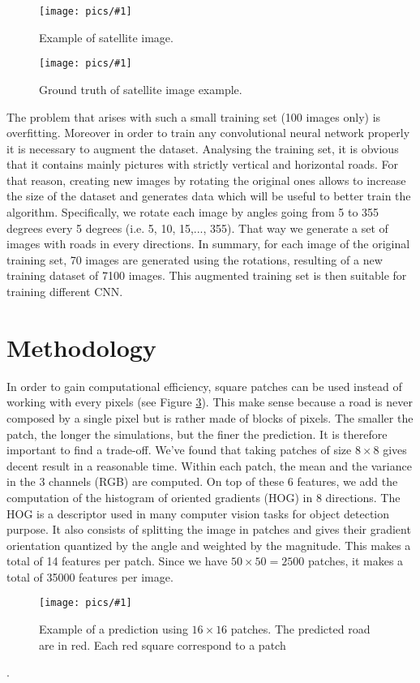 \documentclass[10pt,conference,compsocconf]{IEEEtran}
\newcommand{\scalefig}[4]{
  \begin{figure}[ht!]
    \centering
    \texttt{[image: pics/\#1]}
 \caption{#3}
    \label{#4}
  \end{figure}}
\begin{document}
\scalefig{satImage}{0.8}{Example of satellite image.}{fig:satImage}
\scalefig{satImage_gt}{0.8}{Ground truth of satellite image example.}{fig:satImage}

The problem that arises with such a small training set (100 images only) is overfitting. Moreover in order to train any convolutional neural network properly it is necessary to augment the dataset. Analysing the training set, it is obvious that it contains mainly pictures with strictly vertical and horizontal roads. For that reason, creating new images by rotating the original ones allows to increase the size of the dataset and generates data which will be useful to better train the algorithm. Specifically, we rotate each image by angles going from 5 to 355 degrees every 5 degrees (i.e. 5, 10, 15,..., 355). That way we generate a set of images with roads in every directions. In summary, for each image of the original training set, 70 images are generated using the rotations, resulting of a new training dataset of 7100 images. This augmented training set is then suitable for training different CNN. \\


\section{Methodology}
In order to gain computational efficiency, square patches can be used instead of working with every pixels (see Figure \ref{fig:prediction_patch}). This make sense because a road is never composed by a single pixel but is rather made of blocks of pixels. The smaller the patch, the longer the simulations, but the finer the prediction. It is therefore important to find a trade-off. We've found that taking patches of size $8 \times 8$ gives decent result in a reasonable time. Within each patch, the mean and the variance in the 3 channels (RGB) are computed. On top of these 6 features, we add  the computation of the histogram of oriented gradients (HOG) in 8 directions. The HOG is a descriptor used in many computer vision tasks for object detection purpose. It also consists of splitting the image in patches and gives their gradient orientation quantized by the angle and weighted by the magnitude. This makes a total of 14 features per patch. Since we have $50 \times 50 = 2500$ patches, it makes a total of 35000 features per image.\\
\scalefig{prediction_patch}{0.8}{Example of a prediction using $16 \times 16$ patches. The predicted road are in red. Each red square correspond to a patch}{fig:prediction_patch}.
\end{document}

